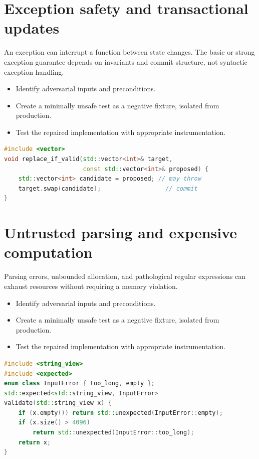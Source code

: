 \documentclass[11pt]{article}
\begin{document}
\section{Exception safety and transactional updates}
An exception can interrupt a function between state changes. The basic or strong exception guarantee depends on invariants and commit structure, not syntactic exception handling.

\begin{itemize}[leftmargin=*,itemsep=1pt,topsep=3pt]
\item Identify adversarial inputs and preconditions.
\item Create a minimally unsafe test as a negative fixture, isolated from production.
\item Test the repaired implementation with appropriate instrumentation.
\end{itemize}
\begin{lstlisting}[language=C++]
#include <vector>
void replace_if_valid(std::vector<int>& target,
                      const std::vector<int>& proposed) {
    std::vector<int> candidate = proposed; // may throw
    target.swap(candidate);                  // commit
}
\end{lstlisting}
\section{Untrusted parsing and expensive computation}
Parsing errors, unbounded allocation, and pathological regular expressions can exhaust resources without requiring a memory violation.

\begin{itemize}[leftmargin=*,itemsep=1pt,topsep=3pt]
\item Identify adversarial inputs and preconditions.
\item Create a minimally unsafe test as a negative fixture, isolated from production.
\item Test the repaired implementation with appropriate instrumentation.
\end{itemize}
\begin{lstlisting}[language=C++]
#include <string_view>
#include <expected>
enum class InputError { too_long, empty };
std::expected<std::string_view, InputError>
validate(std::string_view x) {
    if (x.empty()) return std::unexpected(InputError::empty);
    if (x.size() > 4096)
        return std::unexpected(InputError::too_long);
    return x;
}
\end{lstlisting}
\end{document}
